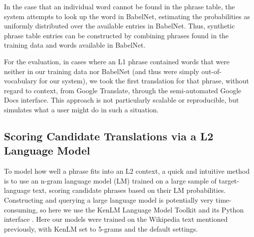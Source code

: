 \documentclass[11pt]{article}
\begin{document}
In the case that an individual word cannot be found in the phrase table, the
system attempts to look up the word in BabelNet, estimating the probabilities
as uniformly distributed over the available entries in BabelNet. Thus,
synthetic phrase table entries can be constructed by combining phrases found in
the training data and words available in BabelNet.

For the evaluation, in cases where an L1 phrase contained words that were
neither in our training data nor BabelNet (and thus were simply
out-of-vocabulary for our system), we took the first translation for that
phrase, without regard to context, from Google Translate, through the
semi-automated Google Docs interface. This approach is not particularly
scalable or reproducible, but simulates what a user might do in such a
situation.



\subsection{Scoring Candidate Translations via a L2 Language Model}
\label{sec:l2model}

To model how well a phrase fits into an L2 context, a quick and intuitive
method is to use an n-gram language model (LM) trained on a large sample of
target-language text, scoring candidate phrases based on their LM
probabilities.
Constructing and querying a large language model is potentially very
time-consuming, so here we use the KenLM Language Model Toolkit and its Python
interface \cite{heafield:kenlm:11}. Here our models were trained
on the Wikipedia text mentioned previously, with KenLM set to 5-grams and the
default settings.
\end{document}
